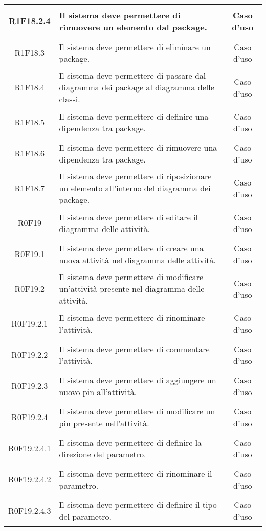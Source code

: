 \documentclass[../AnalisiDeiRequisiti.tex]{subfiles}
\begin{document}
\begin{longtable}{|c|>{\centering}p{7cm}|c|}
\hypertarget{R1F18.2.4}{R1F18.2.4} & Il sistema deve permettere di rimuovere un elemento dal package. & Caso d'uso \\ \hline
\hypertarget{R1F18.3}{R1F18.3} & Il sistema deve permettere di eliminare un package. & Caso d'uso \\ \hline
\hypertarget{R1F18.4}{R1F18.4} & Il sistema deve permettere di passare dal diagramma dei package al diagramma delle classi. & Caso d'uso \\ \hline
\hypertarget{R1F18.5}{R1F18.5} & Il sistema deve permettere di definire una dipendenza tra package. & Caso d'uso \\ \hline
\hypertarget{R1F18.6}{R1F18.6} & Il sistema deve permettere di rimuovere una dipendenza tra package. & Caso d'uso \\ \hline
\hypertarget{R1F18.7}{R1F18.7} & Il sistema deve permettere di riposizionare un elemento all'interno del diagramma dei package. & Caso d'uso \\ \hline
\hypertarget{R0F19}{R0F19} & Il sistema deve permettere di editare il diagramma delle attività. & Caso d'uso \\ \hline
\hypertarget{R0F19.1}{R0F19.1} & Il sistema deve permettere di creare una nuova attività nel diagramma delle attività. & Caso d'uso \\ \hline
\hypertarget{R0F19.2}{R0F19.2} & Il sistema deve permettere di modificare un'attività presente nel diagramma delle attività. & Caso d'uso \\ \hline
\hypertarget{R0F19.2.1}{R0F19.2.1} & Il sistema deve permettere di rinominare l'attività. & Caso d'uso \\ \hline
\hypertarget{R0F19.2.2}{R0F19.2.2} & Il sistema deve permettere di commentare l'attività. & Caso d'uso \\ \hline
\hypertarget{R0F19.2.3}{R0F19.2.3} & Il sistema deve permettere di aggiungere un nuovo pin all'attività. & Caso d'uso \\ \hline
\hypertarget{R0F19.2.4}{R0F19.2.4} & Il sistema deve permettere di modificare un pin presente nell'attività. & Caso d'uso \\ \hline
\hypertarget{R0F19.2.4.1}{R0F19.2.4.1} & Il sistema deve permettere di definire la direzione del parametro. & Caso d'uso \\ \hline
\hypertarget{R0F19.2.4.2}{R0F19.2.4.2} & Il sistema deve permettere di rinominare il parametro. & Caso d'uso \\ \hline
\hypertarget{R0F19.2.4.3}{R0F19.2.4.3} & Il sistema deve permettere di definire il tipo del parametro. & Caso d'uso \\ \hline

\end{longtable}
\end{document}

